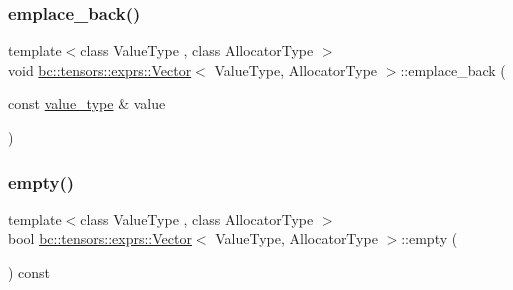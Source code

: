 \subsubsection{\texorpdfstring{emplace\+\_\+back()}{emplace\_back()}\hspace{0.1cm}{\footnotesize\ttfamily [2/2]}}
{\footnotesize\ttfamily template$<$class Value\+Type , class Allocator\+Type $>$ \\
void \hyperlink{structbc_1_1tensors_1_1exprs_1_1Vector}{bc\+::tensors\+::exprs\+::\+Vector}$<$ Value\+Type, Allocator\+Type $>$\+::emplace\+\_\+back (\begin{DoxyParamCaption}\item[{const \hyperlink{structbc_1_1tensors_1_1exprs_1_1Vector_a61ba759af8b26329103ce2b0765dade5}{value\+\_\+type} \&}]{value }\end{DoxyParamCaption})\hspace{0.3cm}{\ttfamily [inline]}}

\mbox{\label{structbc_1_1tensors_1_1exprs_1_1Vector_ad040ded42a1cd570993728cb4703cb05}} 
\subsubsection{\texorpdfstring{empty()}{empty()}}
{\footnotesize\ttfamily template$<$class Value\+Type , class Allocator\+Type $>$ \\
bool \hyperlink{structbc_1_1tensors_1_1exprs_1_1Vector}{bc\+::tensors\+::exprs\+::\+Vector}$<$ Value\+Type, Allocator\+Type $>$\+::empty (\begin{DoxyParamCaption}{ }\end{DoxyParamCaption}) const\hspace{0.3cm}{\ttfamily [inline]}}

\mbox{\label{structbc_1_1tensors_1_1exprs_1_1Vector_a30ea0e61d1f409c405cc29610241170e}} 
